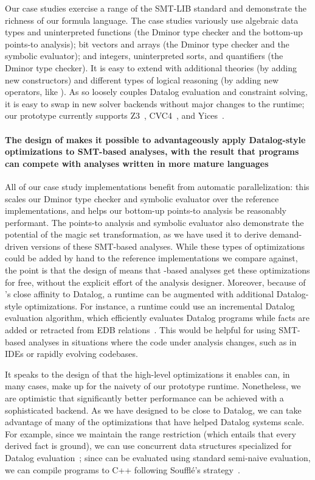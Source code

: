 \documentclass[acmsmall,screen,nonacm]{acmart}
\theoremstyle{definition}
\begin{document}
Our case studies exercise a range of the SMT-LIB standard and demonstrate the
richness of our formula language.
The case studies variously use algebraic data types and uninterpreted functions
(the Dminor type checker and the bottom-up points-to analysis); bit vectors and
arrays (the Dminor type checker and the symbolic evaluator); and integers,
uninterpreted sorts, and quantifiers (the Dminor type checker).
It is easy to extend \Name with additional theories (by adding new
constructors) and different types of logical reasoning (by adding new
operators, like ).
As \Name so loosely couples Datalog evaluation and constraint solving, it
is easy to swap in new solver backends without major changes to the \Name
runtime; our prototype currently supports Z3~\citep{z3}, CVC4~\citep{cvc4}, and
Yices~\citep{yices}.

\paragraph{The design of \Name makes it possible to advantageously apply
Datalog-style optimizations to SMT-based analyses, with the result that \Name
programs can compete with analyses written in more mature languages}
All of our case study implementations benefit from automatic parallelization:
this scales our Dminor type checker and symbolic evaluator over the reference
implementations, and helps our bottom-up points-to analysis be reasonably
performant. 
The points-to analysis and symbolic evaluator also demonstrate the potential of
the magic set transformation, as we have used it to derive demand-driven versions
of these SMT-based analyses.
While these types of optimizations could be added by hand to the reference
implementations we compare against, the point is that the design of \Name means
that \Name-based analyses get these optimizations for free, without the
explicit effort of the analysis designer.
Moreover, because of \Name's close affinity to Datalog, a \Name runtime can
be augmented with additional Datalog-style optimizations.
For instance, a \Name runtime could use an incremental Datalog evaluation
algorithm, which efficiently evaluates Datalog programs while facts are added
or retracted from EDB relations~\citep{gupta1993maintaining,inca}.
This would be helpful for using SMT-based analyses in situations where the code
under analysis changes, such as in IDEs or rapidly evolving codebases.

It speaks to the design of \Name that the high-level optimizations it
enables can, in many cases, make up for the naivety of our prototype
runtime. 
Nonetheless, we are optimistic that significantly better performance can be
achieved with a sophisticated backend.
As we have designed \Name to be close to Datalog, we can take advantage of many
of the optimizations that have helped Datalog systems scale.
For example, since we maintain the range restriction (which entails that
every derived fact is ground), we can use concurrent data structures
specialized for Datalog evaluation~\citep{soufflebtree}; since \Name can be
evaluated using standard semi-naive evaluation, we can compile \Name programs
to C++ following Souffl{\'e}'s strategy~\citep{souffle1}.
\end{document}
